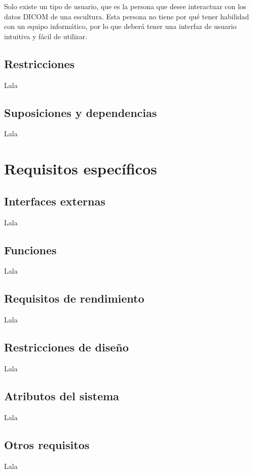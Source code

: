 Solo existe un tipo de usuario, que es la persona que desee interactuar con los datos DICOM de una escultura. Esta persona no tiene por qué tener habilidad con un equipo informático, por lo que \myTitle deberá tener una interfaz de usuario intuitiva y fácil de utilizar.

\subsection{Restricciones}

Lala

\subsection{Suposiciones y dependencias}

Lala

\section{Requisitos específicos}

\subsection{Interfaces externas}

Lala

\subsection{Funciones}

Lala

\subsection{Requisitos de rendimiento}

Lala

\subsection{Restricciones de diseño}

Lala

\subsection{Atributos del sistema}

Lala

\subsection{Otros requisitos}

Lala